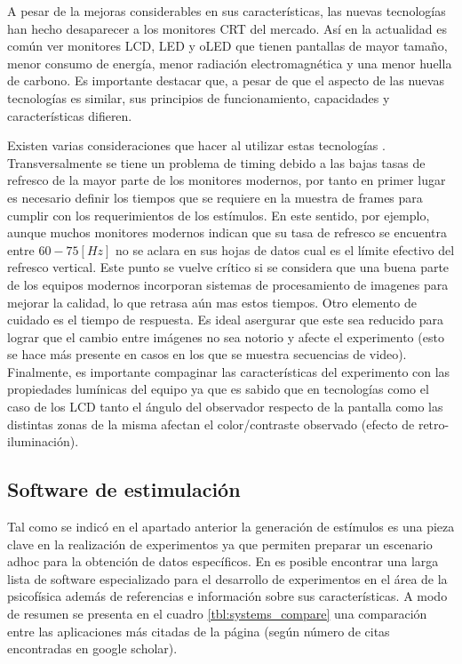 \documentclass[../main.tex]{subfiles}
\begin{document}
			A pesar de la mejoras considerables en sus características, las nuevas tecnologías han hecho desaparecer a los monitores CRT del mercado. Así en la actualidad es común ver monitores LCD, LED y oLED que tienen pantallas de mayor tamaño, menor consumo de energía, menor radiación electromagnética y una menor huella de carbono. Es importante destacar que, a pesar de que el aspecto de las nuevas tecnologías es similar, sus principios de funcionamiento, capacidades y características difieren.

			Existen varias consideraciones que hacer al utilizar estas tecnologías \cite{article:monitor_wang, article:monitor_elze}. Transversalmente se tiene un problema de timing debido a las bajas tasas de refresco de la mayor parte de los monitores modernos, por tanto en primer lugar es necesario definir los tiempos que se requiere en la muestra de frames para cumplir con los requerimientos de los estímulos. En este sentido, por ejemplo, aunque muchos monitores modernos indican que su tasa de refresco se encuentra entre $60-75[Hz]$ no se aclara en sus hojas de datos cual es el límite efectivo del refresco vertical. Este punto se vuelve crítico si se considera que una buena parte de los equipos modernos incorporan sistemas de procesamiento de imagenes para mejorar la calidad, lo que retrasa aún mas estos tiempos. Otro elemento de cuidado es el tiempo de respuesta. Es ideal asergurar que este sea reducido para lograr que el cambio entre imágenes no sea notorio y afecte el experimento (esto se hace más presente en casos en los que se muestra secuencias de video). Finalmente, es importante compaginar las características del experimento con las propiedades lumínicas del equipo ya que es sabido que en tecnologías como el caso de los LCD tanto el ángulo del observador respecto de la pantalla como las distintas zonas de la misma afectan el color/contraste observado (efecto de retro-iluminación). 
			
		\subsection{Software de estimulación}
		\label{sub:02_software_de_estimulacion}

			Tal como se indicó en el apartado anterior la generación de estímulos es una pieza clave en la realización de experimentos ya que permiten preparar un escenario adhoc para la obtención de datos específicos. En \cite{website:software} es posible encontrar una larga lista de software especializado para el desarrollo de experimentos en el área de la psicofísica además de referencias e información sobre sus características. A modo de resumen se presenta en el cuadro \ref{tbl:systems_compare} una comparación entre las aplicaciones más citadas de la página (según número de citas encontradas en google scholar).  
\end{document}

